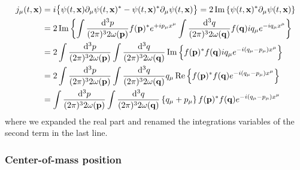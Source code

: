 \begin{equation}
	\begin{split}
		j_\mu(t,\vb{x})
		&=
		i
		\bigl\{
			\psi(t,\vb{x})
			\partial_\mu
			\psi(t,\vb{x})^*
			-
			\psi(t,\vb{x})^*
			\partial_\mu
			\psi(t,\vb{x})
		\bigr\}
		=
		2
		\operatorname{\operatorname{Im}}\left\{
			\psi(t,\vb{x})^*
			\partial_\mu
			\psi(t,\vb{x})
		\right\}
		\\
		&=
		2
		\operatorname{\operatorname{Im}}\left\{
			\int\frac{\dd[3]{p}}{(2\pi)^32\omega(\vb{p})}
			f(\vb{p})^*e^{+ip_\mu x^\mu}
			\int\frac{\dd[3]{q}}{(2\pi)^32\omega(\vb{q})}
			f(\vb{q})iq_\mu e^{-iq_\mu x^\mu}
		\right\}
		\\
		&=
		2
		\int\frac{\dd[3]{p}}{(2\pi)^32\omega(\vb{p})}
		\int\frac{\dd[3]{q}}{(2\pi)^32\omega(\vb{q})}
		\operatorname{\operatorname{Im}}\left\{
			f(\vb{p})^*
			f(\vb{q})
			iq_\mu
			e^{-i(q_\mu-p_\mu)x^\mu}
		\right\}
		\\
		&=
		2
		\int\frac{\dd[3]{p}}{(2\pi)^32\omega(\vb{p})}
		\int\frac{\dd[3]{q}}{(2\pi)^32\omega(\vb{q})}
		q_\mu
		\operatorname{\operatorname{Re}}\left\{
			f(\vb{p})^*
			f(\vb{q})
			e^{-i(q_\mu-p_\mu)x^\mu}
		\right\}
		\\
		&=
		\int\frac{\dd[3]{p}}{(2\pi)^32\omega(\vb{p})}
		\int\frac{\dd[3]{q}}{(2\pi)^32\omega(\vb{q})}
		\left\{
			q_\mu
			+
			p_\mu
		\right\}
		f(\vb{p})^*
		f(\vb{q})
		e^{-i(q_\mu-p_\mu)x^\mu}
	\end{split}
\end{equation}
where we expanded the real part and renamed the integrations variables of the second term in the last line.

\subsubsection{Center-of-mass position}

